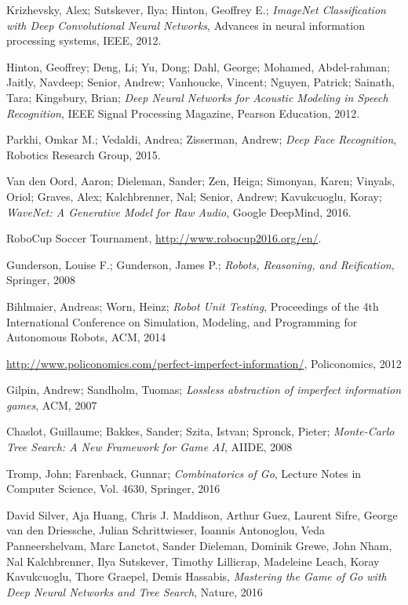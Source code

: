 
%
\newpage  
\begin{thebibliography}{99}
 Krizhevsky, Alex; Sutskever, Ilya; Hinton, Geoffrey E.; \emph{ImageNet Classification with Deep Convolutional Neural Networks}, Advances in neural information processing systems, IEEE, 2012.

 Hinton, Geoffrey; Deng, Li; Yu, Dong; Dahl, George; Mohamed, Abdel-rahman; Jaitly, Navdeep; Senior, Andrew; Vanhoucke, Vincent; Nguyen, Patrick; Sainath, Tara; Kingsbury, Brian; \emph{Deep Neural Networks for Acoustic Modeling in Speech Recognition},  IEEE Signal Processing Magazine, Pearson Education, 2012.

 Parkhi, Omkar M.; Vedaldi, Andrea; Zisserman, Andrew; \emph{Deep Face Recognition}, Robotics Research Group, 2015.

 Van den Oord, Aaron; Dieleman, Sander; Zen, Heiga; Simonyan, Karen; Vinyals, Oriol; Graves, Alex; Kalchbrenner, Nal; Senior, Andrew; Kavukcuoglu, Koray; \emph{WaveNet: A Generative Model for Raw Audio}, Google DeepMind, 2016.

 RoboCup Soccer Tournament, \url{http://www.robocup2016.org/en/}.

 Gunderson, Louise F.; Gunderson, James P.; \emph{Robots, Reasoning, and Reification}, Springer, 2008

 Bihlmaier, Andreas; Worn, Heinz; \emph{Robot Unit Testing}, Proceedings of the 4th International Conference on Simulation, Modeling, and Programming for Autonomous Robots, ACM, 2014

 \url{http://www.policonomics.com/perfect-imperfect-information/}, Policonomics, 2012

 Gilpin, Andrew; Sandholm, Tuomas; \emph{Lossless abstraction of imperfect information games}, ACM, 2007

 Chaslot, Guillaume; Bakkes, Sander; Szita, Istvan; Spronck, Pieter; \emph{Monte-Carlo Tree Search: A New Framework for Game AI}, AIIDE, 2008

 Tromp, John; Farenback, Gunnar; \emph{Combinatorics of Go}, Lecture Notes in Computer Science, Vol. 4630, Springer, 2016

 David Silver, Aja Huang, Chris J. Maddison, Arthur Guez, Laurent Sifre, George van den Driessche, Julian Schrittwieser, Ioannis Antonoglou, Veda Panneershelvam, Marc Lanctot, Sander Dieleman, Dominik Grewe, John Nham, Nal Kalchbrenner, Ilya Sutskever, Timothy Lillicrap, Madeleine Leach, Koray Kavukcuoglu, Thore Graepel, Demis Hassabis, \emph{Mastering the Game of Go with Deep Neural Networks and Tree Search}, Nature, 2016


\end{thebibliography}
